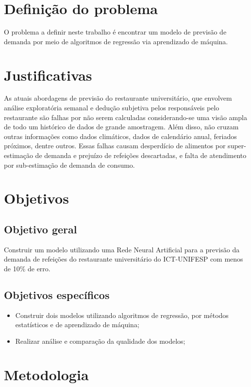 \documentclass[	12pt, Times, openright, twoside, a4paper, english, brazil]{abntex2}
\begin{document}
      \section{Definição do problema}
        O problema a definir neste trabalho é encontrar um modelo de previsão de demanda por meio de algoritmos de regressão via aprendizado de máquina.

      \section{Justificativas}
        As atuais abordagens de previsão do restaurante universitário, que envolvem análise exploratória semanal e dedução subjetiva pelos responsáveis pelo restaurante são falhas por não serem calculadas considerando-se uma visão ampla de todo um histórico de dados de grande amostragem. Além disso, não cruzam outras informações como dados climáticos, dados de calendário anual, feriados próximos, dentre outros. Essas falhas causam desperdício de alimentos por super-estimação de demanda e prejuízo de refeições descartadas, e falta de atendimento por sub-estimação de demanda de consumo.

      \section{Objetivos}
        \subsection{Objetivo geral}
          Construir um modelo utilizando uma Rede Neural Artificial para a previsão da demanda de
          refeições do restaurante universitário do ICT-UNIFESP com menos de 10\% de erro.
        
        \subsection{Objetivos específicos}
          \begin{itemize}
          \item Construir dois modelos utilizando algoritmos de regressão, por métodos estatísticos e de aprendizado de máquina; 
          \item Realizar análise e comparação da qualidade dos modelos; %
          \end{itemize}

      \section{Metodologia}
\end{document}
